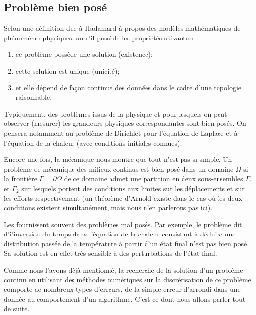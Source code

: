 \subsection{Problème bien posé}
Selon une définition due à Hadamard à propos des
modèles mathématiques de phénomènes physiques, un  s'il possède les propriétés
suivantes:
\begin{enumerate}
   \item ce problème possède une solution (existence);
   \item cette solution est unique (unicité);
   \item et elle dépend de façon continue des données dans le cadre d'une topologie raisonnable.
\end{enumerate}

\medskip
Typiquement, des problèmes issus de la physique et pour lesquels on peut observer (mesurer) les grandeurs physiques correspondantes
sont bien posés. On pensera notamment au problème de Dirichlet pour l'équation de Laplace et à l'équation de la chaleur (avec conditions 
initiales connues). 

\medskip
Encore une fois, la mécanique nous montre que tout n'est pas si simple.
Un problème de mécanique des milieux continus est bien posé dans un domaine $\Omega$ si la frontière $\Gamma=\partial\Omega$ de
ce domaine admet une partition en deux sous-ensembles $\Gamma_1$ et $\Gamma_2$ sur lesquels portent des conditions aux limites
sur les déplacements et sur les efforts respectivement (un théorème d'Arnold existe 
dans le cas où les deux conditions existent simultanément, mais nous n'en parlerons pas ici).


\medskip
Les  fournissent souvent des problèmes mal posés.
Par exemple, le problème dit d'i'inversion du temps dans l'équation de la chaleur consistant à déduire une distribution passée de la 
température à partir d'un état final n'est pas bien posé. Sa solution est en effet très sensible à des perturbations de l'état final. 

\medskip
Comme nous l'avons déjà mentionné, la recherche de la solution d'un problème continu en utilisant des méthodes numériques sur la
discrétisation de ce problème comporte de nombreux types d'erreurs, de la simple erreur d'arrondi dans une donnée au comportement
d'un algorithme. C'est ce dont nous allons parler tout de suite.


